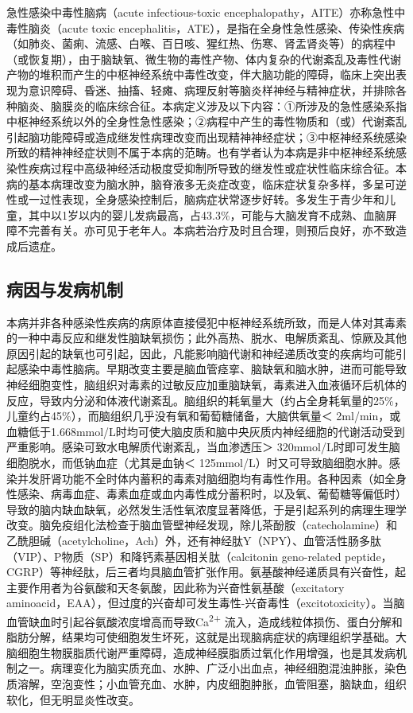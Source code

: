 急性感染中毒性脑病（acute infectious-toxic
encephalopathy，AITE）亦称急性中毒性脑炎（acute toxic
encephalitis，ATE），是指在全身性急性感染、传染性疾病（如肺炎、菌痢、流感、白喉、百日咳、猩红热、伤寒、肾盂肾炎等）的病程中（或恢复期），由于脑缺氧、微生物的毒性产物、体内复杂的代谢紊乱及毒性代谢产物的堆积而产生的中枢神经系统中毒性改变，伴大脑功能的障碍，临床上突出表现为意识障碍、昏迷、抽搐、轻瘫、病理反射等脑炎样神经与精神症状，并排除各种脑炎、脑膜炎的临床综合征。本病定义涉及以下内容：①所涉及的急性感染系指中枢神经系统以外的全身性急性感染；②病程中产生的毒性物质和（或）代谢紊乱引起脑功能障碍或造成继发性病理改变而出现精神神经症状；③中枢神经系统感染所致的精神神经症状则不属于本病的范畴。也有学者认为本病是非中枢神经系统感染性疾病过程中高级神经活动极度受抑制所导致的继发性或症状性临床综合征。本病的基本病理改变为脑水肿，脑脊液多无炎症改变，临床症状复杂多样，多呈可逆性或一过性表现，全身感染控制后，脑病症状常逐步好转。多发生于青少年和儿童，其中以1岁以内的婴儿发病最高，占43.3\%，可能与大脑发育不成熟、血脑屏障不完善有关。亦可见于老年人。本病若治疗及时且合理，则预后良好，亦不致造成后遗症。

\subsection{病因与发病机制}

本病并非各种感染性疾病的病原体直接侵犯中枢神经系统所致，而是人体对其毒素的一种中毒反应和继发性脑缺氧损伤；此外高热、脱水、电解质紊乱、惊厥及其他原因引起的缺氧也可引起，因此，凡能影响脑代谢和神经递质改变的疾病均可能引起感染中毒性脑病。早期改变主要是脑血管痉挛、脑缺氧和脑水肿，进而可能导致神经细胞变性，脑组织对毒素的过敏反应加重脑缺氧，毒素进入血液循环后机体的反应，导致内分泌和体液代谢紊乱。脑组织的耗氧量大（约占全身耗氧量的25\%，儿童约占45\%），而脑组织几乎没有氧和葡萄糖储备，大脑供氧量＜
2ml/min，或血糖低于1.668mmol/L时均可使大脑皮质和脑中央灰质内神经细胞的代谢活动受到严重影响。感染可致水电解质代谢紊乱，当血渗透压＞
320mmol/L时即可发生脑细胞脱水，而低钠血症（尤其是血钠＜
125mmol/L）时又可导致脑细胞水肿。感染并发肝肾功能不全时体内蓄积的毒素对脑细胞均有毒性作用。各种因素（如全身性感染、病毒血症、毒素血症或血内毒性成分蓄积时，以及氧、葡萄糖等偏低时）导致的脑内缺血缺氧，必然发生活性氧浓度显著降低，于是引起系列的病理生理学改变。脑免疫组化法检查于脑血管壁神经发现，除儿茶酚胺（catecholamine）和乙酰胆碱（acetylcholine，Ach）外，还有神经肽Y（NPY）、血管活性肠多肽（VIP）、P物质（SP）和降钙素基因相关肽（calcitonin
geno-related
peptide，CGRP）等神经肽，后三者均具脑血管扩张作用。氨基酸神经递质具有兴奋性，起主要作用者为谷氨酸和天冬氨酸，因此称为兴奋性氨基酸（excitatory
aminoacid，EAA），但过度的兴奋却可发生毒性-兴奋毒性（excitotoxicity）。当脑血管缺血时引起谷氨酸浓度增高而导致Ca\textsuperscript{2+}
流入，造成线粒体损伤、蛋白分解和脂肪分解，结果均可使细胞发生坏死，这就是出现脑病症状的病理组织学基础。大脑细胞生物膜脂质代谢严重障碍，造成神经膜脂质过氧化作用增强，也是其发病机制之一。病理变化为脑实质充血、水肿、广泛小出血点，神经细胞混浊肿胀，染色质溶解，空泡变性；小血管充血、水肿，内皮细胞肿胀，血管阻塞，脑缺血，组织软化，但无明显炎性改变。

